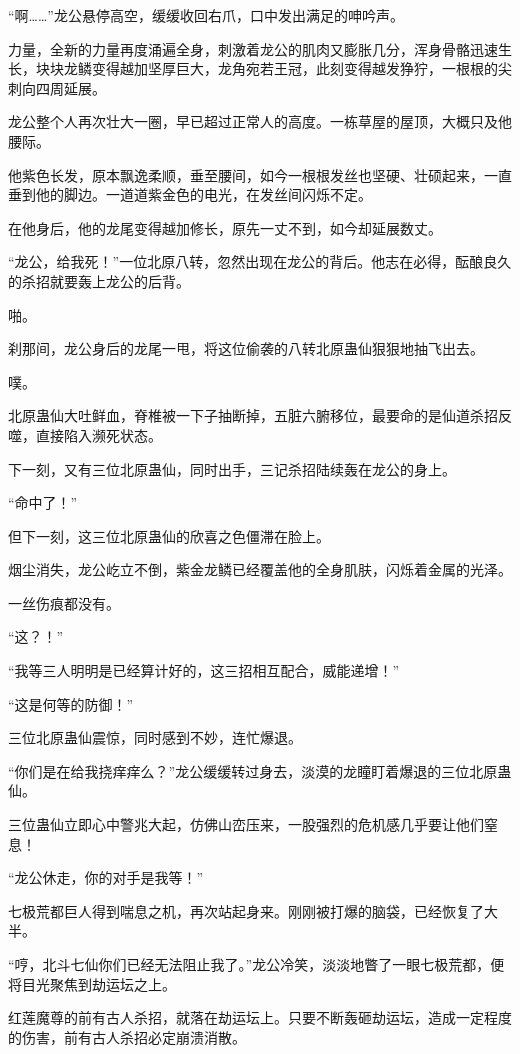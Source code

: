 \begin{this_body}
“啊……”龙公悬停高空，缓缓收回右爪，口中发出满足的呻吟声。

力量，全新的力量再度涌遍全身，刺激着龙公的肌肉又膨胀几分，浑身骨骼迅速生长，块块龙鳞变得越加坚厚巨大，龙角宛若王冠，此刻变得越发狰狞，一根根的尖刺向四周延展。

龙公整个人再次壮大一圈，早已超过正常人的高度。一栋草屋的屋顶，大概只及他腰际。

他紫色长发，原本飘逸柔顺，垂至腰间，如今一根根发丝也坚硬、壮硕起来，一直垂到他的脚边。一道道紫金色的电光，在发丝间闪烁不定。

在他身后，他的龙尾变得越加修长，原先一丈不到，如今却延展数丈。

“龙公，给我死！”一位北原八转，忽然出现在龙公的背后。他志在必得，酝酿良久的杀招就要轰上龙公的后背。

啪。

刹那间，龙公身后的龙尾一甩，将这位偷袭的八转北原蛊仙狠狠地抽飞出去。

噗。

北原蛊仙大吐鲜血，脊椎被一下子抽断掉，五脏六腑移位，最要命的是仙道杀招反噬，直接陷入濒死状态。

下一刻，又有三位北原蛊仙，同时出手，三记杀招陆续轰在龙公的身上。

“命中了！”

但下一刻，这三位北原蛊仙的欣喜之色僵滞在脸上。

烟尘消失，龙公屹立不倒，紫金龙鳞已经覆盖他的全身肌肤，闪烁着金属的光泽。

一丝伤痕都没有。

“这？！”

“我等三人明明是已经算计好的，这三招相互配合，威能递增！”

“这是何等的防御！”

三位北原蛊仙震惊，同时感到不妙，连忙爆退。

“你们是在给我挠痒痒么？”龙公缓缓转过身去，淡漠的龙瞳盯着爆退的三位北原蛊仙。

三位蛊仙立即心中警兆大起，仿佛山峦压来，一股强烈的危机感几乎要让他们窒息！

“龙公休走，你的对手是我等！”

七极荒都巨人得到喘息之机，再次站起身来。刚刚被打爆的脑袋，已经恢复了大半。

“哼，北斗七仙你们已经无法阻止我了。”龙公冷笑，淡淡地瞥了一眼七极荒都，便将目光聚焦到劫运坛之上。

红莲魔尊的前有古人杀招，就落在劫运坛上。只要不断轰砸劫运坛，造成一定程度的伤害，前有古人杀招必定崩溃消散。


\end{this_body}
